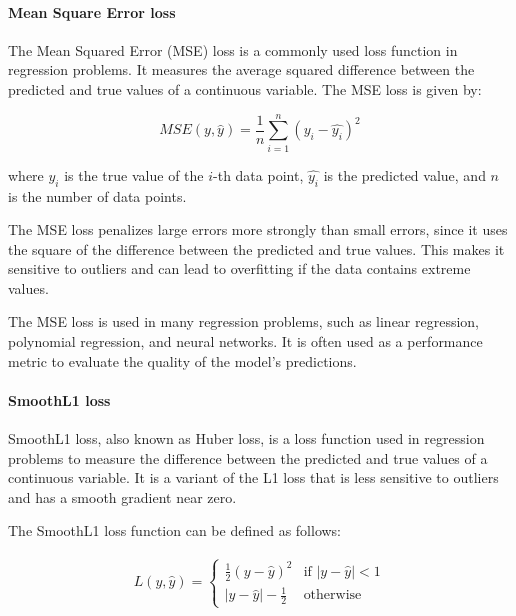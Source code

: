 \paragraph{Mean Square Error loss}
\label{par:3_mse_loss}

The Mean Squared Error (MSE) loss is a commonly used loss function in regression problems. It measures the average squared difference between the predicted and true values of a continuous variable. The MSE loss is given by:

\begin{equation}
	MSE(y, \hat{y}) = \frac{1}{n}\sum_{i=1}^{n}(y_i - \hat{y_i})^2
\end{equation}

where $y_i$ is the true value of the $i$-th data point, $\hat{y_i}$ is the predicted value, and $n$ is the number of data points.

The MSE loss penalizes large errors more strongly than small errors, since it uses the square of the difference between the predicted and true values. This makes it sensitive to outliers and can lead to overfitting if the data contains extreme values.

The MSE loss is used in many regression problems, such as linear regression, polynomial regression, and neural networks. It is often used as a performance metric to evaluate the quality of the model's predictions.

\paragraph{SmoothL1 loss}
\label{par:3_smoothL1_loss}

SmoothL1 loss, also known as Huber loss, is a loss function used in regression problems to measure the difference between the predicted and true values of a continuous variable. It is a variant of the L1 loss that is less sensitive to outliers and has a smooth gradient near zero.

The SmoothL1 loss function can be defined as follows:

\begin{equation}
\begin{split}
	L(y, \hat{y}) = \begin{cases}
		\frac{1}{2}(y - \hat{y})^2 & \text{if } |y - \hat{y}| < 1 \\
		|y - \hat{y}| - \frac{1}{2} & \text{otherwise} \
	\end{cases}
\end{split}
\end{equation}

